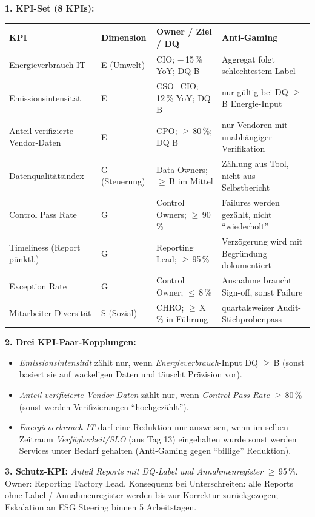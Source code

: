\documentclass[11pt,a4paper,oneside]{article}
\begin{document}
\begin{loesungbox}
\textbf{1. KPI-Set (8 KPIs):}

\smallskip
\begin{tabularx}{\linewidth}{@{}p{4.0cm}p{1.6cm}Xp{1.4cm}@{}}
\toprule
\textbf{KPI} & \textbf{Dimension} & \textbf{Owner / Ziel / DQ} & \textbf{Anti-Gaming} \\
\midrule
Energieverbrauch IT       & E (Umwelt)     & CIO; $-$\,15\,\% YoY; DQ B            & Aggregat folgt schlechtestem Label \\
Emissionsintensit\"at     & E              & CSO+CIO; $-$\,12\,\% YoY; DQ B        & nur g\"ultig bei DQ $\geq$\,B Energie-Input \\
Anteil verifizierte Vendor-Daten & E       & CPO; $\geq$\,80\,\%; DQ B             & nur Vendoren mit unabh\"angiger Verifikation \\
Datenqualit\"atsindex     & G (Steuerung)  & Data Owners; $\geq$\,B im Mittel      & Z\"ahlung aus Tool, nicht aus Selbstbericht \\
Control Pass Rate         & G              & Control Owners; $\geq$\,90\,\%        & Failures werden gez\"ahlt, nicht ``wiederholt'' \\
Timeliness (Report p\"unktl.)& G            & Reporting Lead; $\geq$\,95\,\%        & Verz\"ogerung wird mit Begr\"undung dokumentiert \\
Exception Rate            & G              & Control Owner; $\leq$\,8\,\%          & Ausnahme braucht Sign-off, sonst Failure \\
Mitarbeiter-Diversit\"at  & S (Sozial)     & CHRO; $\geq$\,X\,\% in F\"uhrung      & quartalsweiser Audit-Stichprobenpass \\
\bottomrule
\end{tabularx}

\smallskip
\textbf{2. Drei KPI-Paar-Kopplungen:}
\begin{itemize}
  \item \emph{Emissionsintensit\"at} z\"ahlt nur, wenn \emph{Energieverbrauch}-Input DQ $\geq$\,B (sonst basiert sie auf wackeligen Daten und t\"auscht Pr\"azision vor).
  \item \emph{Anteil verifizierte Vendor-Daten} z\"ahlt nur, wenn \emph{Control Pass Rate} $\geq$\,80\,\% (sonst werden Verifizierungen ``hochgez\"ahlt'').
  \item \emph{Energieverbrauch IT} darf eine Reduktion nur ausweisen, wenn im selben Zeitraum \emph{Verf\"ugbarkeit/SLO} (aus Tag 13) eingehalten wurde \textendash{} sonst werden Services unter Bedarf gehalten (Anti-Gaming gegen ``billige'' Reduktion).
\end{itemize}

\smallskip
\textbf{3. Schutz-KPI:} \emph{Anteil Reports mit DQ-Label und Annahmenregister} $\geq$\,95\,\%. Owner: Reporting Factory Lead. Konsequenz bei Unter\-schreiten: alle Reports ohne Label / Annahmenregister werden bis zur Korrektur zur\"uckgezogen; Eskalation an ESG Steering binnen 5 Arbeitstagen.
\end{loesungbox}
\end{document}
